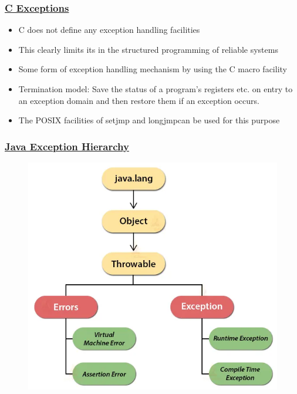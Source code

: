 \begin{frame}[fragile]
    \frametitle{\href{https://www.cs.york.ac.uk/rts/books/RTSbookThirdEdition/chap6.pdf}{C Exceptions}}

    \begin{itemize}
        \item C does not define any exception handling facilities
        \item This  clearly  limits  its  in  the  structured  programming  of  reliable systems
        \item Some form of exception handling mechanism by using the C macro facility
        \item Termination  model: Save  the status of a program's registers etc. on entry to an exception domain and then restore them if an exception occurs.
        \item The POSIX facilities of setjmp and longjmpcan be used for this purpose
    \end{itemize}

\end{frame}
\begin{frame}[fragile]
    \frametitle{\href{https://i0.wp.com/techvidvan.com/tutorials/wp-content/uploads/sites/2/2020/04/java-exception-hierarchy.jpg}{Java Exception Hierarchy}}
    \begin{figure}
    \includegraphics[width=0.5\linewidth]{figs/java-exception-hierarchy.png}
    \end{figure}

\end{frame}
